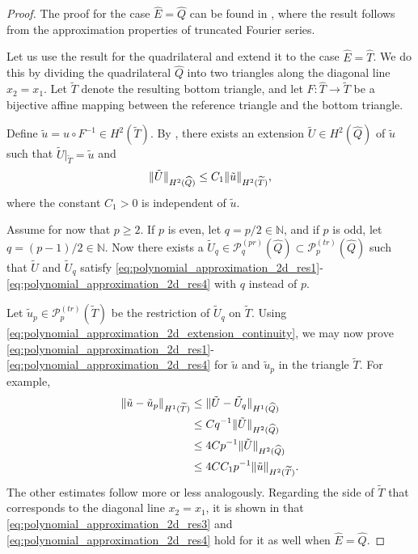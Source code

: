 \documentclass[english, 12pt, a4paper, sci, utf8, a-2b, online]{aaltothesis}
\theoremstyle{definition}
\theoremstyle{plain}
\DeclarePairedDelimiter\norm{\lVert}{\rVert}
\numberwithin{equation}{section}
\begin{document}
\begin{proof}
    The proof for the case $\widehat{E} = \widehat{Q}$
    can be found in \cite[Lemma~3.1]{babuskasuri1987},
    where the result follows from the approximation properties
    of truncated Fourier series.

    Let us use the result for the quadrilateral
    and extend it to the case $\widehat{E} = \widehat{T}$.
    We do this by
    dividing the quadrilateral $\widehat{Q}$ into two triangles
    along the diagonal line $x_2 = x_1$.
    Let $\widetilde{T}$ denote the resulting bottom triangle,
    and let $F: \widehat{T} \to \widetilde{T}$ be a bijective affine mapping
    between the reference triangle and the bottom triangle.
    
    Define $\tilde{u} = u \circ F^{-1} \in H^2(\widetilde{T})$.
    By \cite[Theorem~5 on p.~181]{stein1970},
    there exists an extension $\tilde{U} \in H^2(\widehat{Q})$ of $\tilde{u}$
    such that $\tilde{U}|_{\widetilde{T}} = \tilde{u}$ and
    \begin{equation}
        \label{eq:polynomial_approximation_2d_extension_continuity}
        \norm{\tilde{U}}_{H^2(\widehat{Q})}
        \leq C_1 \norm{\tilde{u}}_{H^2(\widetilde{T})},
    \end{equation}
    where the constant $C_1 > 0$ is independent of $\tilde{u}$.

    Assume for now that $p \geq 2$.
    If $p$ is even, let $q = p/2 \in \mathbb{N}$,
    and if $p$ is odd, let $q = (p-1)/2 \in \mathbb{N}$.
    Now there exists a $\tilde{U}_q \in \mathcal{P}_q^{(pr)}(\widehat{Q})
    \subset \mathcal{P}_p^{(tr)}(\widehat{Q})$
    such that $\tilde{U}$ and $\tilde{U}_q$ satisfy
    \eqref{eq:polynomial_approximation_2d_res1}-\eqref{eq:polynomial_approximation_2d_res4}
    with $q$ instead of $p$.
    
    Let $\tilde{u}_p \in \mathcal{P}_p^{(tr)}(\widetilde{T})$
    be the restriction of $\tilde{U}_q$ on $\widetilde{T}$.
    Using \eqref{eq:polynomial_approximation_2d_extension_continuity},
    we may now prove
    \eqref{eq:polynomial_approximation_2d_res1}-\eqref{eq:polynomial_approximation_2d_res4}
    for $\tilde{u}$ and $\tilde{u}_p$ in the triangle $\widetilde{T}$.
    For example,
    \begin{align*}
        \norm{\tilde{u}-\tilde{u}_p}_{H^1(\widetilde{T})}
        &\leq \norm{\tilde{U}-\tilde{U}_q}_{H^1(\widehat{Q})} \\
        &\leq C q^{-1} \norm{\tilde{U}}_{H^2(\widehat{Q})} \\
        &\leq 4C p^{-1} \norm{\tilde{U}}_{H^2(\widehat{Q})} \\
        &\leq 4C C_1 p^{-1} \norm{\tilde{u}}_{H^2(\widetilde{T})}.
    \end{align*}
    The other estimates follow more or less analogously.
    Regarding the side of $\widetilde{T}$ that corresponds to the diagonal line $x_2=x_1$,
    it is shown in \cite[Lemma~3.1]{babuskasuri1987} that
    \eqref{eq:polynomial_approximation_2d_res3}
    and \eqref{eq:polynomial_approximation_2d_res4}
    hold for it as well when $\widehat{E} = \widehat{Q}$.


\end{proof}
\end{document}
